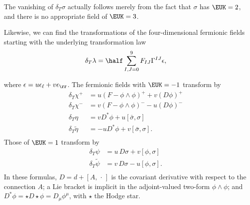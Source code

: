 The vanishing of $\delta_T\sigma$ actually follows merely from the
fact that $\sigma$ has ${\EUK}=2$, and there is no appropriate
field of ${\EUK}=3$.

Likewise, we can find the transformations of the four-dimensional
fermionic fields starting with the underlying transformation law
\setcounter{equation}{25}
\begin{equation}\label{eq:invo}
\delta_T\lambda=\half\sum_{I,J=0}^9F_{IJ}\Gamma^{IJ}\epsilon,
\end{equation}

where $\epsilon=u\epsilon_\ell+v\epsilon_\rr$. The fermionic
fields with ${\EUK}=-1$ transform by
\setcounter{equation}{26}
\begin{equation}\label{eq:helpme}
\begin{aligned}\delta_T\chi^+ & = u(F-\phi\wedge\phi)^+
+v(D\phi)^+\\ \delta_T\chi^-& = v(F-\phi\wedge\phi)^- -
u(D\phi)^-\\ \delta_T\eta& = vD^*\phi+u[\bar\sigma,\sigma] \\
\delta_T\tilde\eta& = -uD^* \phi+v[\bar\sigma,\sigma].\\\end{aligned}
\end{equation}
 Those
of ${\EUK}=1$ transform by %
\setcounter{equation}{27}
\begin{equation}\label{eq:mimo}
\begin{aligned}\delta_T\psi& = u\,
D\sigma +v[\phi,\sigma]\\ \delta_T\tilde\psi & = v\, D\sigma - u
[\phi,\sigma].\\\end{aligned}
\end{equation}
 In these formulas, $D=d+[A,\,\cdot \,]$ is the
covariant derivative with respect to the connection $A$; a Lie
bracket is implicit in the adjoint-valued two-form
$\phi\wedge\phi$; and $D^*\phi=\star D \star \phi =
D_\mu\phi^\mu$, with $\star$ the Hodge star.
